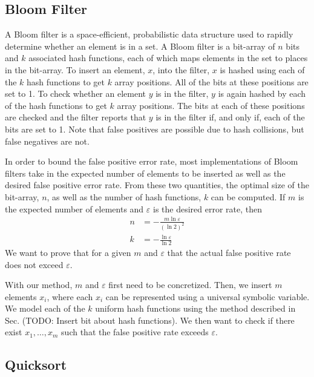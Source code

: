 \documentclass[acmsmall,review]{acmart}\settopmatter{}
\begin{document}
	\subsection{Bloom Filter}
	\label{sec:bloom_filter}
	
	A Bloom filter is a space-efficient, probabilistic data structure used to rapidly determine whether an element is in a set.
	A Bloom filter is a bit-array of $n$ bits and $k$ associated hash functions, each of which maps elements in the set to places in the bit-array.
	To insert an element, $x$, into the filter, $x$ is hashed using each of the $k$ hash functions to get $k$ array positions.
	All of the bits at these positions are set to 1.
	To check whether an element $y$ is in the filter, $y$ is again hashed by each of the hash functions to get $k$ array positions.
	The bits at each of these positions are checked and the filter reports that $y$ is in the filter if, and only if, each of the bits are set to 1.
	Note that false positives are possible due to hash collisions, but false negatives are not.
	
	
	In order to bound the false positive error rate, most implementations of Bloom filters take in the expected number of elements to be inserted as well as the desired false positive error rate.
	From these two quantities, the optimal size of the bit-array, $n$, as well as the number of hash functions, $k$ can be computed.
	If $m$ is the expected number of elements and $\varepsilon$ is the desired error rate, then
	\begin{align*}
		n &= - \frac{m\ln \varepsilon}{(\ln 2)^2}\\
		k &= - \frac{\ln \varepsilon}{\ln 2}
	\end{align*}
	We want to prove that for a given $m$ and $\varepsilon$ that the actual false positive rate does not exceed $\varepsilon$.
	
	
	With our method, $m$ and $\varepsilon$ first need to be concretized. 
	Then, we insert $m$ elements $x_i$, where each $x_i$ can be represented using a universal symbolic variable.
	We model each of the $k$ uniform hash functions using the method described in Sec. (TODO: Insert bit about hash functions).
	We then want to check if there exist $x_1,\ldots,x_m$ such that the false positive rate exceeds $\varepsilon$.
	
	\subsection{Quicksort}
	\label{sec:quicksort}
	
\end{document}
